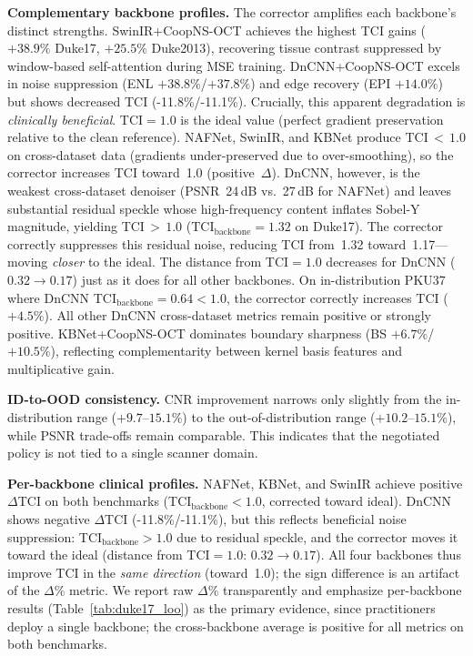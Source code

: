 \documentclass{ieeetj}
\begin{document}
\textbf{Complementary backbone profiles.} The corrector amplifies each backbone's distinct strengths. SwinIR+CoopNS-OCT achieves the highest TCI gains ($+38.9\%$ Duke17, $+25.5\%$ Duke2013), recovering tissue contrast suppressed by window-based self-attention during MSE training. DnCNN+CoopNS-OCT excels in noise suppression (ENL $+38.8\%$/$+37.8\%$) and edge recovery (EPI $+14.0\%$) but shows decreased TCI (-11.8\%/-11.1\%). Crucially, this apparent degradation is \emph{clinically beneficial}. TCI${}=1.0$ is the ideal value (perfect gradient preservation relative to the clean reference). NAFNet, SwinIR, and KBNet produce TCI$\,{<}\,1.0$ on cross-dataset data (gradients under-preserved due to over-smoothing), so the corrector increases TCI toward~1.0 (positive~$\Delta$). DnCNN, however, is the weakest cross-dataset denoiser (PSNR~24\,dB vs.\ 27\,dB for NAFNet) and leaves substantial residual speckle whose high-frequency content inflates Sobel-Y magnitude, yielding TCI$\,{>}\,1.0$ ($\text{TCI}_\text{backbone} = 1.32$ on Duke17). The corrector correctly suppresses this residual noise, reducing TCI from~1.32 toward~1.17---moving \emph{closer} to the ideal. The distance from TCI${}=1.0$ decreases for DnCNN ($0.32 \to 0.17$) just as it does for all other backbones. On in-distribution PKU37 where DnCNN TCI$_\text{backbone} = 0.64 < 1.0$, the corrector correctly increases TCI ($+4.5\%$). All other DnCNN cross-dataset metrics remain positive or strongly positive. KBNet+CoopNS-OCT dominates boundary sharpness (BS $+6.7\%$/$+10.5\%$), reflecting complementarity between kernel basis features and multiplicative gain.

\textbf{ID-to-OOD consistency.} CNR improvement narrows only slightly from the in-distribution range ($+9.7$--$15.1\%$) to the out-of-distribution range ($+10.2$--$15.1\%$), while PSNR trade-offs remain comparable. This indicates that the negotiated policy is not tied to a single scanner domain.

\textbf{Per-backbone clinical profiles.} NAFNet, KBNet, and SwinIR achieve positive $\Delta$TCI on both benchmarks (TCI$_\text{backbone} < 1.0$, corrected toward ideal). DnCNN shows negative $\Delta$TCI (-11.8\%/-11.1\%), but this reflects beneficial noise suppression: TCI$_\text{backbone} > 1.0$ due to residual speckle, and the corrector moves it toward the ideal (distance from TCI${}=1.0$: $0.32 \to 0.17$). All four backbones thus improve TCI in the \emph{same direction} (toward~1.0); the sign difference is an artifact of the $\Delta\%$ metric. We report raw $\Delta\%$ transparently and emphasize per-backbone results (Table~\ref{tab:duke17_loo}) as the primary evidence, since practitioners deploy a single backbone; the cross-backbone average is positive for all metrics on both benchmarks.
\end{document}
